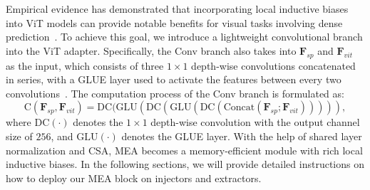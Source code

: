 \myparagraph{\textcolor{orange}{Conv Branch.}} 
Empirical evidence has demonstrated that incorporating local inductive biases into ViT models can provide notable benefits for visual tasks involving dense prediction~\citep{peng2021conformer,wu2021cvt,li2022next,zhang2023cae}. To achieve this goal, we introduce a lightweight convolutional branch into the ViT adapter. Specifically, the Conv branch also takes into $\textbf{F}_{sp}$ and $\textbf{F}_{vit}$ as the input, which consists of three $1 \times 1$ depth-wise convolutions concatenated in series, with a GLUE layer used to activate the features between every two convolutions~\citep{saxe2013exact,he2023simplifying}. The computation process of the Conv branch is formulated as:
\begin{equation}
\textrm{C}(\textbf{F}_{sp},\textbf{F}_{vit}) = \textrm{DC}(\textrm{GLU}(\textrm{DC}(\textrm{GLU}(\textrm{DC}(\textrm{Concat}(\textbf{F}_{sp};\textbf{F}_{vit}))))),
\label{eq:5}
\end{equation}
where $\textrm{DC}(\cdot)$ denotes the $1 \times 1$ depth-wise convolution with the output channel size of $256$, and $\textrm{GLU}(\cdot)$ denotes the GLUE layer.
With the help of shared layer normalization and CSA, MEA becomes a memory-efficient module with rich local inductive biases. In the following sections, we will provide detailed instructions on how to deploy our MEA block on injectors and extractors.
